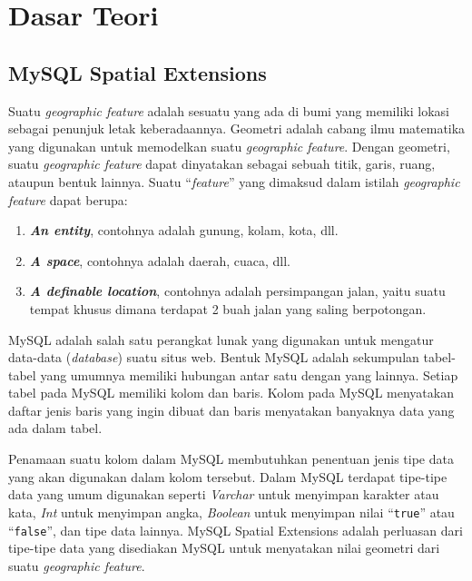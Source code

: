 \chapter{Dasar Teori}
\label{chap:dasar_teori}

\section{MySQL Spatial Extensions}
\label{sec:mysql_spatial_ex}
	Suatu \textit{geographic feature}\cite{mysqlspatial} adalah sesuatu yang ada di bumi yang memiliki lokasi sebagai penunjuk letak keberadaannya. Geometri adalah cabang ilmu matematika yang digunakan untuk memodelkan suatu \textit{geographic feature}. Dengan geometri, suatu \textit{geographic feature} dapat dinyatakan sebagai sebuah titik, garis, ruang, ataupun bentuk lainnya. Suatu ``\textit{feature}'' yang dimaksud dalam istilah \textit{geographic feature} dapat berupa:
	\begin{enumerate}
		\item \textbf{\textit{An entity}}, contohnya adalah gunung, kolam, kota, dll.
		\item \textbf{\textit{A space}}, contohnya adalah daerah, cuaca, dll.
		\item \textbf{\textit{A definable location}}, contohnya adalah persimpangan jalan, yaitu suatu tempat khusus dimana terdapat 2 buah jalan yang saling berpotongan.
	\end{enumerate}
	
	MySQL adalah salah satu perangkat lunak yang digunakan untuk mengatur data-data (\textit{database}) suatu situs web. Bentuk MySQL adalah sekumpulan tabel-tabel yang umumnya memiliki hubungan antar satu dengan yang lainnya. Setiap tabel pada MySQL memiliki kolom dan baris. Kolom pada MySQL menyatakan daftar jenis baris yang ingin dibuat dan baris menyatakan banyaknya data yang ada dalam tabel.
	
	Penamaan suatu kolom dalam MySQL membutuhkan penentuan jenis tipe data yang akan digunakan dalam kolom tersebut. Dalam MySQL terdapat tipe-tipe data yang umum digunakan seperti \textit{Varchar} untuk menyimpan karakter atau kata, \textit{Int} untuk menyimpan angka, \textit{Boolean} untuk menyimpan nilai ``\texttt{true}'' atau ``\texttt{false}'', dan tipe data lainnya. MySQL Spatial Extensions adalah perluasan dari tipe-tipe data yang disediakan MySQL untuk menyatakan nilai geometri dari suatu \textit{geographic feature}.
	
